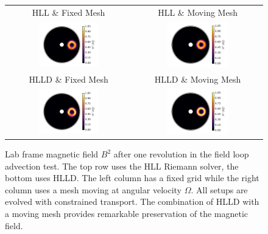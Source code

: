 \begin{figure}
\begin{center}
\begin{tabular}{cc}
	HLL \& Fixed Mesh & HLL \& Moving Mesh \\
	\includegraphics[width=0.5\textwidth]{figures/numerics/floop_hlle_fix.png} & \includegraphics[width=0.5\textwidth]{figures/numerics/floop_hlle_mov.png} \\
	HLLD \& Fixed Mesh & HLLD \& Moving Mesh \\
	\includegraphics[width=0.5\textwidth]{figures/numerics/floop_hlld_fix.png} & \includegraphics[width=0.5\textwidth]{figures/numerics/floop_hlld_mov.png} 
\end{tabular}
\end{center}
\caption{Lab frame magnetic field $B^2$ after one revolution in the field loop advection test.  The top row uses the HLL Riemann solver, the bottom uses HLLD.  The left column has a fixed grid while the right column uses a mesh moving at angular velocity $\Omega$.  All setups are evolved with constrained transport. The combination of HLLD with a moving mesh provides remarkable preservation of the magnetic field.  }
\end{figure}

